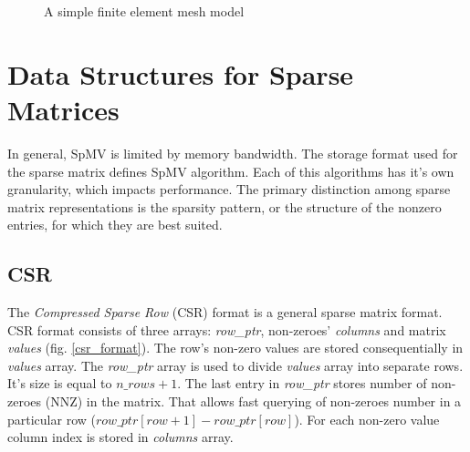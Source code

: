 \documentclass{article}
\begin{document}
\begin{figure}[H]
{
  }
  \caption{A simple finite element mesh model}
  \label{fem_to_sparse_matrix}
\end{figure}

\section{Data Structures for Sparse Matrices}
In general, SpMV is limited by memory bandwidth. The storage format used for the sparse matrix defines SpMV algorithm. Each of this
algorithms has it's own granularity, which impacts performance. The primary distinction among sparse matrix representations is the 
sparsity pattern, or the structure of the nonzero entries, for which they are best suited. 

\subsection{CSR}

The \textit{Compressed Sparse Row} (CSR) format is a general sparse matrix format. CSR format consists of three arrays: \textit{row\_ptr},
non-zeroes' \textit{columns} and matrix \textit{values} (fig. \ref{csr_format}). The row's non-zero values are stored consequentially in \textit{values} array. The \textit{row\_ptr} array
is used to divide \textit{values} array into separate rows. It's size is equal to $n\_rows + 1$. The last entry in \textit{row\_ptr} stores number of non-zeroes (NNZ) in the
matrix. That allows fast querying of non-zeroes number in a particular row ($row\_ptr[row+1] - row\_ptr[row]$).
For each non-zero value column index is stored in \textit{columns} array.
\end{document}
